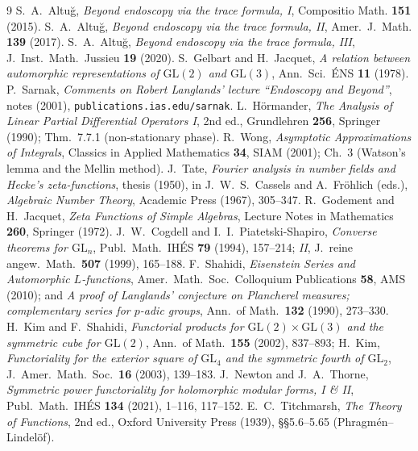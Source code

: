 \documentclass[11pt]{article}
\theoremstyle{definition}
\begin{document}
\begin{thebibliography}{9}
 S.~A.~Altu\u{g}, \emph{Beyond endoscopy via the trace formula, I}, Compositio Math.
\textbf{151} (2015).
 S.~A.~Altu\u{g}, \emph{Beyond endoscopy via the trace formula, II}, Amer.\ J.\ Math.
\textbf{139} (2017).
 S.~A.~Altu\u{g}, \emph{Beyond endoscopy via the trace formula, III}, J.\ Inst.\
Math.\ Jussieu \textbf{19} (2020).
 S.~Gelbart and H.~Jacquet, \emph{A relation between automorphic representations of
$\mathrm{GL}(2)$ and $\mathrm{GL}(3)$}, Ann.\ Sci.\ \'ENS \textbf{11} (1978).
\bibitem{Sar} P.~Sarnak, \emph{Comments on Robert Langlands' lecture ``Endoscopy and Beyond''}, notes
(2001), \texttt{publications.ias.edu/sarnak}.
 L.~H\"ormander, \emph{The Analysis of Linear Partial Differential Operators I},
2nd ed., Grundlehren \textbf{256}, Springer (1990); Thm.~7.7.1 (non-stationary phase).
\bibitem{Wong} R.~Wong, \emph{Asymptotic Approximations of Integrals}, Classics in Applied
Mathematics \textbf{34}, SIAM (2001); Ch.~3 (Watson's lemma and the Mellin method).
\bibitem{Tate} J.~Tate, \emph{Fourier analysis in number fields and Hecke's zeta-functions}, thesis
(1950), in J.~W.~S.~Cassels and A.~Fr\"ohlich (eds.), \emph{Algebraic Number Theory}, Academic Press
(1967), 305--347.
 R.~Godement and H.~Jacquet, \emph{Zeta Functions of Simple Algebras}, Lecture Notes in
Mathematics \textbf{260}, Springer (1972).
 J.~W.~Cogdell and I.~I.~Piatetski-Shapiro, \emph{Converse theorems for
$\mathrm{GL}_n$}, Publ.\ Math.\ IH\'ES \textbf{79} (1994), 157--214; \emph{II}, J.\ reine angew.\
Math.\ \textbf{507} (1999), 165--188.
\bibitem{Shahidi} F.~Shahidi, \emph{Eisenstein Series and Automorphic $L$-functions}, Amer.\ Math.\
Soc.\ Colloquium Publications \textbf{58}, AMS (2010); and \emph{A proof of Langlands' conjecture on
Plancherel measures; complementary series for $p$-adic groups}, Ann.\ of Math.\ \textbf{132} (1990),
273--330.
\bibitem{KimShahidi} H.~Kim and F.~Shahidi, \emph{Functorial products for
$\mathrm{GL}(2)\times\mathrm{GL}(3)$ and the symmetric cube for $\mathrm{GL}(2)$}, Ann.\ of Math.\
\textbf{155} (2002), 837--893; H.~Kim, \emph{Functoriality for the exterior square of
$\mathrm{GL}_4$ and the symmetric fourth of $\mathrm{GL}_2$}, J.\ Amer.\ Math.\ Soc.\ \textbf{16}
(2003), 139--183.
\bibitem{NT} J.~Newton and J.~A.~Thorne, \emph{Symmetric power functoriality for holomorphic modular
forms, I \& II}, Publ.\ Math.\ IH\'ES \textbf{134} (2021), 1--116, 117--152.
\bibitem{Titchmarsh} E.~C.~Titchmarsh, \emph{The Theory of Functions}, 2nd ed., Oxford University
Press (1939), \S\S5.6--5.65 (Phragm\'en--Lindel\"of).
\end{thebibliography}
\end{document}
